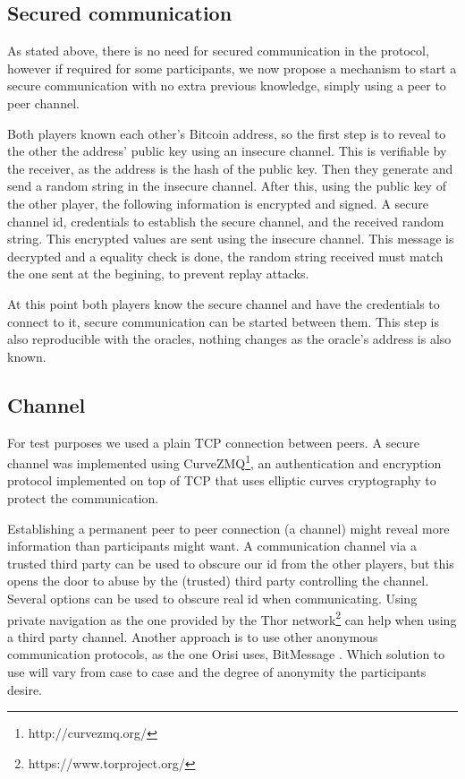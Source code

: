 \subsection{Secured communication} \label{subsec:secured_comm}

As stated above, there is no need for secured communication in the protocol,
  however if required for some participants, we now propose a mechanism to
  start a secure communication with no extra previous knowledge, simply using
  a peer to peer channel.

Both players known each other's Bitcoin address, so the first step is to
  reveal to the other the address' public key using an insecure channel.
This is verifiable by the receiver, as the address is the hash of the public
  key.
Then they generate and send a random string in the insecure channel.
After this, using the public key of the other player, the following
  information is encrypted and signed.
A secure channel id, credentials to establish the secure channel, and the
  received random string. This encrypted values are sent using the insecure
  channel.
This message is decrypted and a equality check is done, the random string
  received must match the one sent at the begining, to prevent replay
  attacks.

At this point both players know the secure channel and have the credentials
  to connect to it, secure communication can be started between them. This
  step is also reproducible with the oracles, nothing changes as the oracle's
  address is also known.

\subsection{Channel}

For test purposes we used a plain TCP connection between peers.
A secure channel was implemented using
  CurveZMQ\footnote{http://curvezmq.org/}, an authentication and encryption
  protocol implemented on top of TCP that uses elliptic curves cryptography to
  protect the communication.

Establishing a permanent peer to peer connection (a channel) might reveal more
  information than participants might want.
A communication channel via a trusted third party can be used to obscure our id
  from the other players, but this opens the door to abuse by the (trusted)
  third party controlling the channel.
Several options can be used to obscure real id when communicating.
Using private navigation as the one provided by the Thor network\footnote{%
    https://www.torproject.org/} can help when using a third party channel.
Another approach is to use other anonymous communication protocols, as the
  one Orisi uses, BitMessage \cite{warren2012bitmessage}.
Which solution to use will vary from case to case and the degree of anonymity
  the participants desire.


